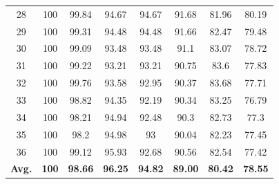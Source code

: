 \documentclass[review]{elsarticle}
\begin{document}
\begin{longtable}{c|ccccccc}
		28&100&99.84&94.67&94.67&91.68&81.96&80.19\\
		29&100&99.31&94.48&94.48&91.66&82.47&79.48\\
		30&100&99.09&93.48&93.48&91.1&83.07&78.72\\
		31&100&99.22&93.21&93.21&90.75&83.6&77.83\\
		32&100&99.76&93.58&92.95&90.37&83.68&77.71\\
		33&100&98.82&94.35&92.19&90.34&83.25&76.79\\
		34&100&98.21&94.94&92.48&90.3&82.73&77.3\\
		35&100&98.2&94.98&93&90.04&82.23&77.45\\
		36&100&99.12&95.93&92.68&90.56&82.54&77.42\\
		
		\hline
		\textbf{Avg.}&\textbf{100}&\textbf{98.66}&\textbf{96.25}&\textbf{94.82}&\textbf{89.00}&\textbf{80.42}&\textbf{78.55}\\
		\hline\hline	
\end{longtable}
\end{document}
